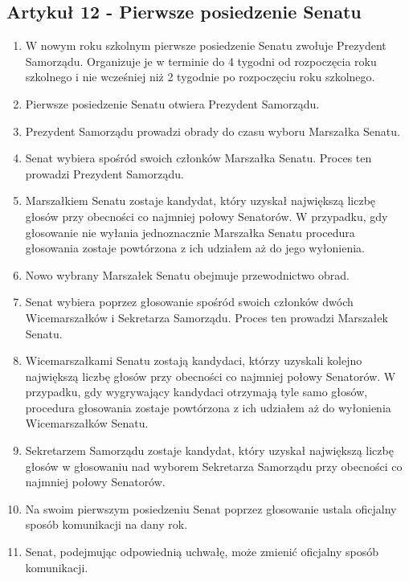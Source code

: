 \documentclass[14pt]{article}
\newenvironment{ustepy}{%
	\begin{enumerate}[leftmargin=1.5em, itemindent=1pt, labelwidth=1em, itemsep=5pt]
	}{%
	\end{enumerate}
}
\begin{document}
\subsection*{Artykuł 12 - Pierwsze posiedzenie Senatu}
\begin{ustepy}
	\item W nowym roku szkolnym pierwsze posiedzenie Senatu zwołuje Prezydent Samorządu. Organizuje je w terminie do 4 tygodni od rozpoczęcia roku szkolnego i nie wcześniej niż 2 tygodnie po rozpoczęciu roku szkolnego.
	\item Pierwsze posiedzenie Senatu otwiera Prezydent Samorządu.
	\item Prezydent Samorządu prowadzi obrady do czasu wyboru Marszałka Senatu.
	\item Senat wybiera spośród swoich członków Marszałka Senatu. Proces ten prowadzi Prezydent Samorządu.
	\item Marszałkiem Senatu zostaje kandydat, który uzyskał największą liczbę głosów przy obecności co najmniej połowy Senatorów. W przypadku, gdy głosowanie nie wyłania jednoznacznie Marszałka Senatu procedura głosowania zostaje powtórzona z ich udziałem aż do jego wyłonienia.
	\item Nowo wybrany Marszałek Senatu obejmuje przewodnictwo obrad.
	\item Senat wybiera poprzez głosowanie spośród swoich członków dwóch Wicemarszałków i Sekretarza Samorządu. Proces ten prowadzi Marszałek Senatu.
	\item Wicemarszałkami Senatu zostają kandydaci, którzy uzyskali kolejno największą liczbę głosów  przy obecności co najmniej połowy Senatorów. W przypadku, gdy wygrywający kandydaci otrzymają tyle samo głosów, procedura głosowania zostaje powtórzona z ich udziałem aż do wyłonienia Wicemarszałków Senatu. 
	\item Sekretarzem Samorządu zostaje kandydat, który uzyskał największą liczbę głosów w głosowaniu nad wyborem Sekretarza Samorządu przy obecności co najmniej połowy Senatorów.
	\item Na swoim pierwszym posiedzeniu Senat poprzez głosowanie ustala oficjalny sposób komunikacji na dany rok. 
	\item Senat, podejmując odpowiednią uchwałę, może zmienić oficjalny sposób komunikacji.
\end{ustepy}
\end{document}
